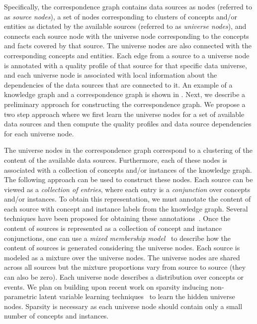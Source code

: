 \documentclass{sig-alternate}
\begin{document}
Specifically, the correspondence graph contains data sources as nodes (referred to as {\em source nodes}), a set of nodes corresponding to clusters of concepts and/or entities as dictated by the available sources (referred to as {\em universe nodes}), and connects each source node with the universe node corresponding to the concepts and facts covered by that source. The universe nodes are also connected with the corresponding concepts and entities.  Each edge from a source to a universe node is annotated with a quality profile of that source for that specific data universe, and each universe node is associated with local information about the dependencies of the data sources that are connected to it. An example of a knowledge graph and a correspondence graph is shown in . Next, we describe a preliminary approach for constructing the correspondence graph. We propose a two step approach where we first learn the universe nodes for a set of available data sources and then compute the quality profiles and data source dependencies for each universe node. 

The universe nodes in the correspondence graph correspond to a clustering of the content of the available data sources. Furthermore, each of these nodes is associated with a collection of concepts and/or instances of the knowledge graph. The following approach can be used to construct these nodes. Each source can be viewed as a {\em collection of entries}, where each entry is a {\em conjunction} over concepts and/or instances. To obtain this representation, we must annotate the content of each source with concept and instance labels from the knowledge graph. Several techniques have been proposed for obtaining these annotations~\cite{spotlight,limaye:2010}. Once the content of sources is represented as a collection of concept and instance conjunctions, one can use a {\em mixed membership model}~\cite{blei:2003} to describe how the content of sources is generated considering the universe nodes. Each source is modeled as a mixture over the universe nodes. The universe nodes are shared across all sources but the mixture proportions vary from source to source (they can also be zero). Each universe node describes a distribution over concepts or events. We plan on building upon recent work on sparsity inducing non-parametric latent variable learning techniques~\cite{elidan:2005, sdm:2013} to learn the hidden universe nodes. Sparsity is necessary as each universe node should contain only a small number of concepts and instances. 
\end{document}
